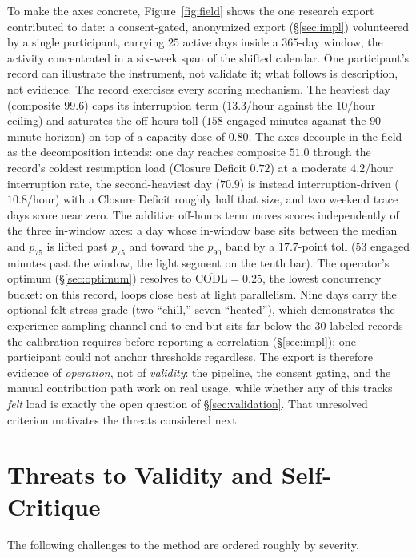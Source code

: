 \documentclass[10pt,twocolumn]{article}
\begin{document}
To make the axes concrete, Figure~\ref{fig:field} shows the one research
export contributed to date: a consent-gated, anonymized export
(\S\ref{sec:impl}) volunteered by a single participant, carrying $25$ active
days inside a $365$-day window, the activity concentrated in a six-week span
of the shifted calendar. One participant's record can illustrate the
instrument, not validate it; what follows is description, not evidence.
The record exercises every scoring mechanism. The heaviest day (composite
$99.6$) caps its
interruption term ($13.3$/hour against the $10$/hour ceiling) and saturates
the off-hours toll ($158$ engaged minutes against the $90$-minute horizon)
on top of a capacity-dose of $0.80$. The axes decouple in the field as the
decomposition intends: one day reaches composite $51.0$ through the record's
coldest resumption load (Closure Deficit $0.72$) at a moderate $4.2$/hour
interruption rate, the second-heaviest day ($70.9$) is instead
interruption-driven ($10.8$/hour) with a Closure Deficit roughly half that
size, and two weekend trace days score near zero. The additive off-hours
term moves scores independently of the three in-window axes: a day whose
in-window base sits between the median and $p_{75}$ is lifted past $p_{75}$
and toward the $p_{90}$ band by a $17.7$-point toll ($53$ engaged minutes
past the window, the light segment on the tenth bar). The operator's optimum
(\S\ref{sec:optimum}) resolves to $\overline{\mathrm{CODL}}=0.25$, the
lowest concurrency bucket: on this record, loops close best at light
parallelism. Nine days carry the optional felt-stress grade (two ``chill,''
seven ``heated''), which demonstrates the experience-sampling channel end to
end but sits far below the $30$ labeled records the calibration requires
before reporting a correlation (\S\ref{sec:impl}); one participant could not
anchor thresholds regardless. The export
is therefore evidence of \emph{operation}, not of \emph{validity}: the
pipeline, the consent gating, and the manual contribution path work on real
usage, while whether any of this tracks \emph{felt} load is exactly the open
question of \S\ref{sec:validation}. That
unresolved criterion motivates the threats considered next.

\section{Threats to Validity and Self-Critique}\label{sec:threats}
The following challenges to the method are ordered roughly by severity.
\end{document}
